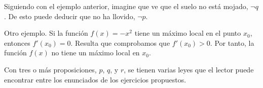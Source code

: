 Siguiendo con el ejemplo anterior, imagine que ve que el suelo no está
mojado, $\neg q$. De esto puede deducir que no ha llovido, $\neg p$.

Otro ejemplo. Si la función $f(x) = {-x}^2$ tiene un máximo local en el
punto $x_0$, entonces $f'(x_0) = 0$. Resulta que comprobamos que $f'(x_0) >
0$. Por tanto, la función $f(x)$ no tiene un máximo local en $x_0$.

Con tres o más proposiciones, $p$, $q$, y $r$, se tienen varias leyes que el
lector puede encontrar entre los enunciados de los ejercicios propuestos.









